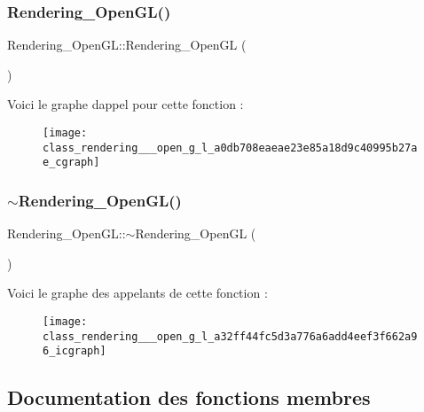 \subsubsection{\texorpdfstring{Rendering\+\_\+\+Open\+G\+L()}{Rendering\_OpenGL()}}
{\footnotesize\ttfamily Rendering\+\_\+\+Open\+G\+L\+::\+Rendering\+\_\+\+Open\+GL (\begin{DoxyParamCaption}{ }\end{DoxyParamCaption})\hspace{0.3cm}{\ttfamily [inline]}}

Voici le graphe d\textquotesingle{}appel pour cette fonction \+:\nopagebreak
\begin{figure}[H]
\begin{center}
\leavevmode
\texttt{[image: class\_rendering\_\_\_open\_g\_l\_a0db708eaeae23e85a18d9c40995b27ae\_cgraph]}
\end{center}
\end{figure}
\mbox{\label{class_rendering___open_g_l_a32ff44fc5d3a776a6add4eef3f662a96}} 
\subsubsection{\texorpdfstring{$\sim$\+Rendering\+\_\+\+Open\+G\+L()}{~Rendering\_OpenGL()}}
{\footnotesize\ttfamily Rendering\+\_\+\+Open\+G\+L\+::$\sim$\+Rendering\+\_\+\+Open\+GL (\begin{DoxyParamCaption}{ }\end{DoxyParamCaption})}

Voici le graphe des appelants de cette fonction \+:\nopagebreak
\begin{figure}[H]
\begin{center}
\leavevmode
\texttt{[image: class\_rendering\_\_\_open\_g\_l\_a32ff44fc5d3a776a6add4eef3f662a96\_icgraph]}
\end{center}
\end{figure}


\subsection{Documentation des fonctions membres}
\mbox{\label{class_rendering___open_g_l_a9621079239b6b621dfc8f9c4e93bdd7a}} 

